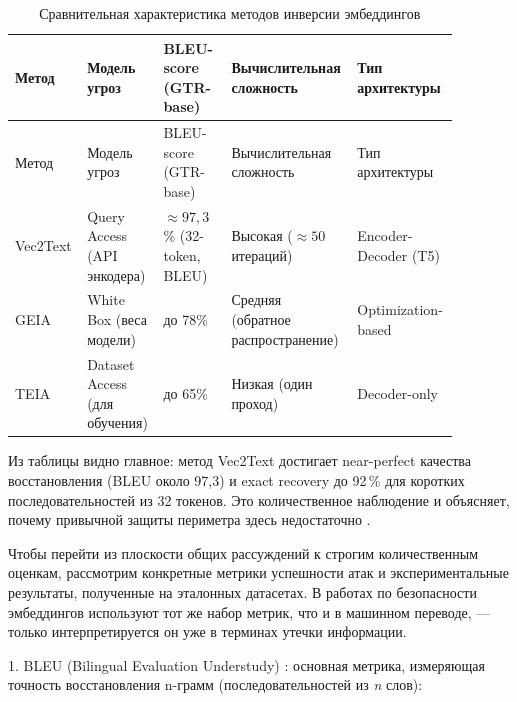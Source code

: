 \documentclass[a4paper, 12pt, oneside, openany]{article}
\begin{document}
\begingroup\small\setlength{\tabcolsep}{3pt}
\begin{longtable}{@{}
		>{\raggedright\arraybackslash}p{0.14\linewidth}
		>{\raggedright\arraybackslash}p{0.16\linewidth}
		>{\raggedright\arraybackslash}p{0.15\linewidth}
		>{\raggedright\arraybackslash}p{0.26\linewidth}
		>{\raggedright\arraybackslash}p{0.17\linewidth}
		@{}}
	\caption{Сравнительная характеристика методов инверсии эмбеддингов}\label{tab:1-1}\\*
	\toprule
	Метод & Модель угроз & BLEU-score (GTR-base) & Вычислительная сложность & Тип архитектуры \\
	\midrule
	\endfirsthead
	
	\toprule
	Метод & Модель угроз & BLEU-score (GTR-base) & Вычислительная сложность & Тип архитектуры \\
	\midrule
	\endhead
	
	\bottomrule
	\endfoot
	
	\bottomrule
	\endlastfoot
	
	Vec2Text & Query Access (API энкодера) & $\approx 97{,}3$\% (32-token, BLEU) & Высокая ($\approx 50$ итераций) & Encoder-Decoder (T5) \\
	GEIA & White Box (веса модели) & до 78\% & Средняя (обратное распространение) & Optimization-based \\
	TEIA & Dataset Access (для обучения) & до 65\% & Низкая (один проход) & Decoder-only \\
	
\end{longtable}
\endgroup

Из таблицы видно главное: метод Vec2Text достигает near-perfect качества восстановления (BLEU около 97{,}3) и exact recovery до 92\,\% для коротких последовательностей из 32 токенов. Это количественное наблюдение и объясняет, почему привычной защиты периметра здесь недостаточно \cite{ref5}.

Чтобы перейти из плоскости общих рассуждений к строгим количественным оценкам, рассмотрим конкретные метрики успешности атак и экспериментальные результаты, полученные на эталонных датасетах. В работах по безопасности эмбеддингов используют тот же набор метрик, что и в машинном переводе, — только интерпретируется он уже в терминах утечки информации.

1. BLEU (Bilingual Evaluation Understudy) \cite{ref21}: основная метрика, измеряющая точность восстановления n-грамм (последовательностей из \emph{n} слов):
\end{document}
